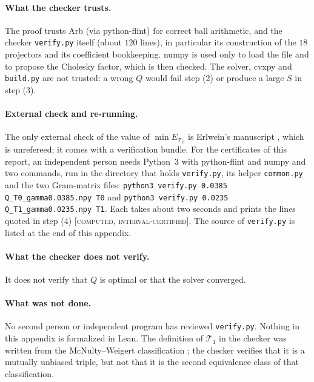 \documentclass[11pt]{article}
\newcommand{\Tz}{\mathcal{T}_0}          %
\newcommand{\To}{\mathcal{T}_1}          %
\newcommand{\E}{E}                       %
\newcommand{\st}[1]{\textsc{[#1]}}
\newcommand{\stcert}{\st{computed, interval-certified}}
\theoremstyle{definition}
\theoremstyle{remark}
\begin{document}
\paragraph{What the checker trusts.} The proof trusts Arb (via python-flint) for correct ball arithmetic, and the
checker \texttt{verify.py} itself (about $120$ lines), in particular its construction of the $18$ projectors and its
coefficient bookkeeping. numpy is used only to load the file and to propose the Cholesky factor, which is then
checked. The solver, cvxpy and \texttt{build.py} are not trusted: a wrong $Q$ would fail step (2) or produce a large
$S$ in step (3).

\paragraph{External check and re-running.} The only external check of the value of $\min\E_{\Tz}$ is Erlwein's
manuscript \cite{Erlwein}, which is unrefereed; it comes with a verification bundle. For the certificates of this report,
an independent person needs Python~3 with python-flint and numpy and two commands, run in the directory that holds
\texttt{verify.py}, its helper \texttt{common.py} and the two Gram-matrix files:
\texttt{python3 verify.py 0.0385 Q\_T0\_gamma0.0385.npy T0} and
\texttt{python3 verify.py 0.0235 Q\_T1\_gamma0.0235.npy T1}.
Each takes about two seconds and prints the lines quoted in step (4) \stcert. The source of \texttt{verify.py} is listed
at the end of this appendix.

\paragraph{What the checker does not verify.} It does not verify that $Q$ is optimal or that the solver converged.

\paragraph{What was not done.} No second person or independent program has reviewed \texttt{verify.py}. Nothing in
this appendix is formalized in Lean. The definition of $\To$ in the checker was written from the McNulty--Weigert
classification \cite{MWreview}; the checker verifies that it is a mutually unbiased triple, but not that it is the
second equivalence class of that classification.
\end{document}
